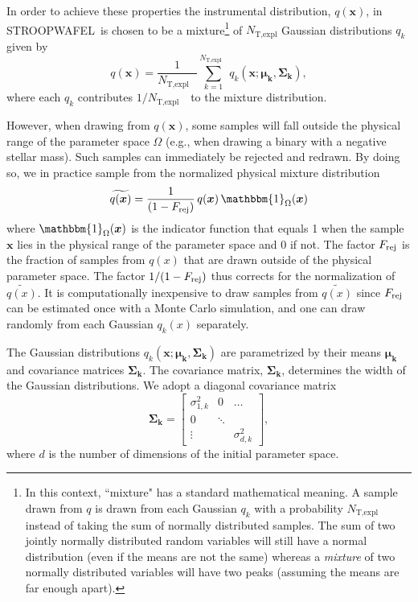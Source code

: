 \documentclass[a4paper,fleqn,usenatbib,useAMS,usedcolumn]{mnras}
\newcommand{\AISs}{\textsc{STROOPWAFEL}}
\newcommand{\NEhits}{$N_{\text{T,expl}}$ }
\begin{document}
In order to achieve these properties the instrumental distribution, $q(\boldsymbol{x})$, in \AISs \ is chosen to be a mixture\footnote{In this context, ``mixture" has a standard mathematical meaning. A sample drawn from $q$ is drawn from each Gaussian $q_k$ with a probability $N_{\text{T,expl}}$ instead of taking the sum of normally distributed samples. The sum of two jointly normally distributed random variables will still have a normal distribution (even if the means are not the same) whereas a \emph{mixture} of two normally distributed variables will have two peaks (assuming the means are far enough apart).} of \NEhits Gaussian distributions $q_k$ 
given by
%
\begin{equation}
	q(\boldsymbol{x}) =  \frac{1}{ \text{\NEhits}} \sum_{k={1}}^{\text{\NEhits}}  q_k({\boldsymbol{x}; \boldsymbol {\mu _{k},\Sigma _{k}}}),
	\label{eq:instrumental}
\end{equation}
%
where each $q_k$ contributes $1 / \text{\NEhits}$ to the mixture distribution. 

However, when drawing from $q(\boldsymbol{x})$, some samples will fall outside the physical range of the parameter space  $\Omega$ (e.g., when drawing a binary with a negative stellar mass). Such samples  can immediately be rejected and redrawn. By doing so, we in practice sample from the normalized physical mixture distribution
%
\begin{equation}
	\widetilde{q(\boldsymbol{x})} =  \frac{1}{(1-F_{\rm{rej}})} \, q(\boldsymbol{x}) \, \mathbbm{1}_{\Omega}(\boldsymbol{x} ) 
	\label{eq:instrumental}
\end{equation}
%
where $\mathbbm{1}_{\Omega}(\boldsymbol{x})$ is the indicator function that equals 1 when the sample $\boldsymbol{x}$ lies in the physical range of the parameter space and 0 if not. The factor $ F_{\rm{rej}}$ is the fraction of samples from $q(x)$ that are drawn outside of the physical parameter space.  The factor $1/ (1 - F_{\rm{rej}})$  thus corrects for the normalization of $\widetilde{q(x)}$.     It is computationally inexpensive to draw samples from $\widetilde{q(x)}$ since $F_{\rm{rej}}$ can be estimated once with a Monte Carlo simulation, and one can draw randomly from each Gaussian $q_k(x)$ separately. 

The Gaussian distributions  $q_k({\boldsymbol{x}; \boldsymbol {\mu _{k},\Sigma _{k}}})$ are parametrized by their means $\boldsymbol{\mu_k}$ and covariance matrices $\boldsymbol{\Sigma_k}$. 
The covariance matrix, $\boldsymbol{\Sigma_k}$, determines the width of the Gaussian distributions. We adopt a diagonal covariance matrix  
%
\begin{equation}
	\boldsymbol{\Sigma_k} = \begin{bmatrix} 
    		\sigma_{1,k}^2 	& 0 	& \dots \\
    		0 				& \ddots & \\

    		\vdots	 			&      & \sigma_{d,k}^2 
    \end{bmatrix}, 
	\label{eq:covariance-matrix}
\end{equation}
%
where $d$ is the number of dimensions of the initial parameter space.  
\end{document}
